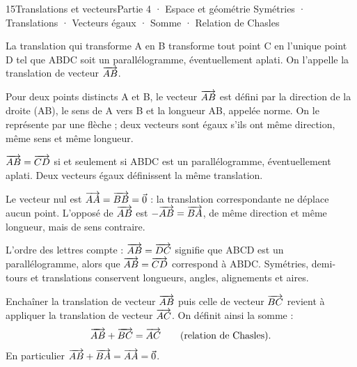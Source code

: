 \begin{ouverture}[vecteursplan]{15}{Translations et vecteurs}{Partie 4 · Espace et géométrie}
{Symétries · Translations · Vecteurs égaux · Somme · Relation de Chasles}
\end{ouverture}
\pagestyle{otMain}\essentiel\fontsize{11}{15}\selectfont
{}
\begin{definition}La translation qui transforme A en B transforme tout point C en l’unique point D tel que ABDC soit un parallélogramme, éventuellement aplati. On l’appelle la translation de vecteur $\overrightarrow{AB}$.\end{definition}
\begin{definition}Pour deux points distincts A et B, le vecteur $\overrightarrow{AB}$ est défini par la direction de la droite (AB), le sens de A vers B et la longueur AB, appelée norme. On le représente par une flèche ; deux vecteurs sont égaux s’ils ont même direction, même sens et même longueur.\end{definition}
\begin{propriete}$\overrightarrow{AB}=\overrightarrow{CD}$ si et seulement si ABDC est un parallélogramme, éventuellement aplati. Deux vecteurs égaux définissent la même translation.\end{propriete}
\begin{definition}Le vecteur nul est $\overrightarrow{AA}=\overrightarrow{BB}=\vec0$ : la translation correspondante ne déplace aucun point. L’opposé de $\overrightarrow{AB}$ est $-\overrightarrow{AB}=\overrightarrow{BA}$, de même direction et même longueur, mais de sens contraire.\end{definition}
\begin{attention}L’ordre des lettres compte : $\overrightarrow{AB}=\overrightarrow{DC}$ signifie que ABCD est un parallélogramme, alors que $\overrightarrow{AB}=\overrightarrow{CD}$ correspond à ABDC. Symétries, demi-tours et translations conservent longueurs, angles, alignements et aires.\end{attention}
\clearpage
{}
\begin{propriete}Enchaîner la translation de vecteur $\overrightarrow{AB}$ puis celle de vecteur $\overrightarrow{BC}$ revient à appliquer la translation de vecteur $\overrightarrow{AC}$. On définit ainsi la somme :
\[\overrightarrow{AB}+\overrightarrow{BC}=\overrightarrow{AC}\qquad\text{(relation de Chasles).}\]
En particulier $\overrightarrow{AB}+\overrightarrow{BA}=\overrightarrow{AA}=\vec0$.\end{propriete}
